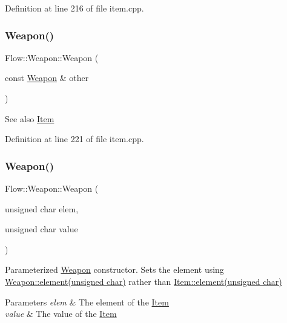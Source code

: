 Definition at line 216 of file item.\+cpp.

\hypertarget{class_flow_1_1_weapon_a07aaf63f1e08014a451d36a675b5cf89}{}\label{class_flow_1_1_weapon_a07aaf63f1e08014a451d36a675b5cf89} 
\subsubsection{\texorpdfstring{Weapon()}{Weapon()}\hspace{0.1cm}{\footnotesize\ttfamily [2/4]}}
{\footnotesize\ttfamily Flow\+::\+Weapon\+::\+Weapon (\begin{DoxyParamCaption}\item[{const \hyperlink{class_flow_1_1_weapon}{Weapon} \&}]{other }\end{DoxyParamCaption})}

\begin{DoxySeeAlso}{See also}
\hyperlink{class_flow_1_1_item}{Item} 
\end{DoxySeeAlso}


Definition at line 221 of file item.\+cpp.

\hypertarget{class_flow_1_1_weapon_ab533e5af85bbd0d5a852005dfadc192b}{}\label{class_flow_1_1_weapon_ab533e5af85bbd0d5a852005dfadc192b} 
\subsubsection{\texorpdfstring{Weapon()}{Weapon()}\hspace{0.1cm}{\footnotesize\ttfamily [3/4]}}
{\footnotesize\ttfamily Flow\+::\+Weapon\+::\+Weapon (\begin{DoxyParamCaption}\item[{unsigned char}]{elem,  }\item[{unsigned char}]{value }\end{DoxyParamCaption})}

Parameterized \hyperlink{class_flow_1_1_weapon}{Weapon} constructor. Sets the element using \hyperlink{class_flow_1_1_weapon_a5e008e915610d3ba9d38fed417c807b8}{Weapon\+::element(unsigned char)} rather than \hyperlink{class_flow_1_1_item_a9a9f3132cecb67d6104668100f00cd47}{Item\+::element(unsigned char)} 
\begin{DoxyParams}{Parameters}
{\em elem} & The element of the \hyperlink{class_flow_1_1_item}{Item} \\
\hline
{\em value} & The value of the \hyperlink{class_flow_1_1_item}{Item} \\
\hline
\end{DoxyParams}


